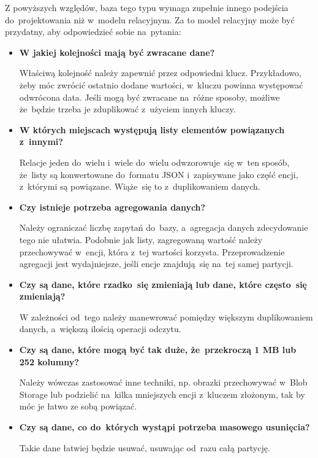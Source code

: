 \documentclass[12pt,a4paper,twoside,titlepage,openright]{book}
\begin{document}
Z powyższych względów, baza tego typu wymaga zupełnie innego podejścia do~projektowania niż w~modelu relacyjnym. Za to model relacyjny może być przydatny, aby odpowiedzieć sobie na~pytania:
\begin{itemize}
\item \textbf{W jakiej kolejności mają być zwracane dane?}

Właściwą kolejność należy zapewnić przez odpowiedni klucz. Przykładowo, żeby móc zwrócić ostatnio dodane wartości, w~kluczu powinna występować odwrócona data. Jeśli mogą być zwracane na~różne sposoby, możliwe że~będzie trzeba je zduplikować z~użyciem innych kluczy.

\item \textbf{W których miejscach występują listy elementów powiązanych z~innymi?}

Relacje jeden do~wielu i~wiele do~wielu odwzorowuje~się w~ten sposób, że~listy są konwertowane do~formatu JSON i~zapisywane jako część encji, z~którymi są powiązane. Wiąże~się to z~duplikowaniem danych.

\item \textbf{Czy istnieje potrzeba agregowania danych?}

Należy ograniczać liczbę zapytań do~bazy, a~agregacja danych zdecydowanie tego nie ułatwia. Podobnie jak listy, zagregowaną wartość należy przechowywać w~encji, która z~tej wartości korzysta. Przeprowadzenie agregacji jest wydajniejsze, jeśli encje znajdują~się na~tej samej partycji.

\item \textbf{Czy są dane, które rzadko~się zmieniają lub dane, które często~się zmieniają?}

W zależności od~tego należy manewrować pomiędzy większym duplikowaniem danych, a~większą ilością operacji odczytu.

\item \textbf{Czy są dane, które mogą być tak duże, że~przekroczą 1 MB lub 252 kolumny?}

Należy wówczas zastosować inne techniki, np. obrazki przechowywać w~Blob Storage lub podzielić na~kilka mniejszych encji z~kluczem złożonym, tak by móc je łatwo ze sobą powiązać.

\item \textbf{Czy są dane, co do~których wystąpi potrzeba masowego usunięcia?}

Takie dane łatwiej będzie usuwać, usuwając od~razu całą partycję.
\end{itemize}
\end{document}
